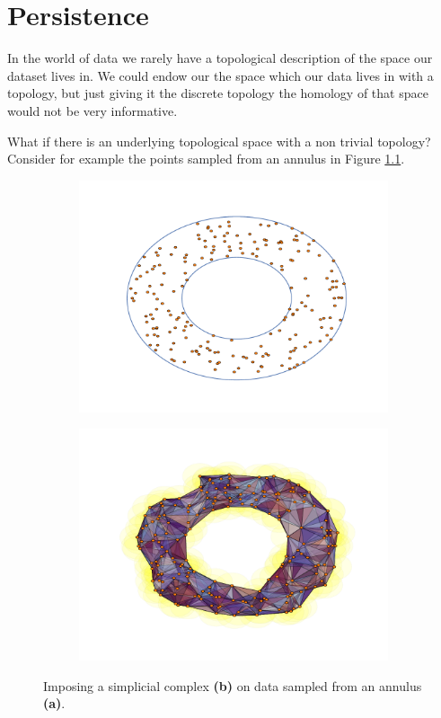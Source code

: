\chapter{Persistence}
In the world of data we rarely have a topological description of the space our dataset lives in. We could endow our the space which our data lives in with a topology, but just giving it the discrete topology the homology of that space would not be very informative.

What if there is an underlying topological space with a non trivial topology? Consider for example the points sampled from an annulus in Figure \ref{annulus:points}.

\begin{figure}[ht]
  \centering
  \begin{subfigure}[t]{.5\linewidth}
    \includegraphics[scale=.5]{annulus.pdf}
    \caption{\label{annulus:points}}
 \end{subfigure}%
  \begin{subfigure}[t]{.5\linewidth}
    \includegraphics[scale=.5]{annulus_rips.pdf}
    \caption{\label{annulus:imposed}}
 \end{subfigure}
  \caption{\label{annulus} Imposing a simplicial complex \textbf{(b)} on data sampled from an annulus \textbf{(a)}.}
\end{figure}


